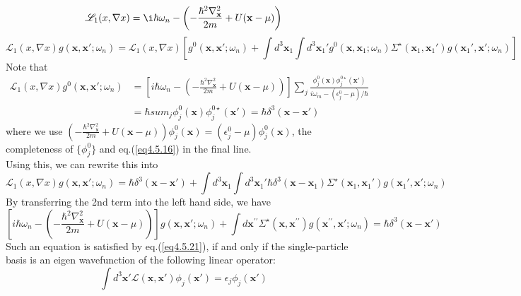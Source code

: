 \begin{equation}
\mathscr{L}_1(x,\nabla x)=\i\hbar \omega_n - \left( -\frac{\hbar^2\nabla^2_\mathbf{x}}{2m}+U(\mathbf{x}-\mu)\right)
\end{equation}
\[
\mathscr{L}_1(x,\nabla x) g(\mathbf{x},\mathbf{x}';\omega_n)=\mathscr{L}_1(x,\nabla x) \left[ g^0(\mathbf{x},\mathbf{x}';\omega_n)+\int d^3\mathbf{x}_1 \int d^3\mathbf{x}_1' g^0(\mathbf{x},\mathbf{x}_1;\omega_n)\Sigma^\star (\mathbf{x}_1,\mathbf{x}_1')g(\mathbf{x}_1',\mathbf{x}';\omega_n)\right]
\]
Note that
\begin{equation}\label{eq4.5.24}
\begin{aligned}
\mathscr{L}_1(x,\nabla x) g^0(\mathbf{x},\mathbf{x}';\omega_n)
&=\left[i\hbar \omega_n - \left( -\frac{\hbar^2\nabla^2_\mathbf{x}}{2m}+U(\mathbf{x}-\mu)\right) \right] \sum_j \frac{\phi_j^0(\mathbf{x})\phi_j^{0\star}(\mathbf{x'})}{i\omega_m-(\epsilon_j^0-\mu)/\hbar}\\
&=\hbar sum_j \phi_j^0(\mathbf{x})\phi_j^{0\star}(\mathbf{x'})=\hbar \delta^3 (\mathbf{x}-\mathbf{x}')
\end{aligned}
\end{equation}
where we use $\left( -\frac{\hbar^2\nabla^2_\mathbf{x}}{2m}+U(\mathbf{x}-\mu)\right)\phi_j^0 (\mathbf{x})=(\epsilon_j^0-\mu) \phi_j^0(\mathbf{x})$, the completeness of $\{ \phi_j^0\}$ and eq.(\ref{eq4.5.16}) in the final line.\\
Using this, we can rewrite this into
\begin{equation}
\mathscr{L}_1(x,\nabla x) g(\mathbf{x},\mathbf{x}';\omega_n)=\hbar \delta^3(\mathbf{x}-\mathbf{x}')+\int d^3\mathbf{x}_1\int d^3\mathbf{x}_1'\hbar \delta^3(\mathbf{x}-\mathbf{x}_1)\Sigma^\star (\mathbf{x}_1,\mathbf{x}_1')g(\mathbf{x}_1',\mathbf{x}';\omega_n)
\end{equation}
By transferring the 2nd term into the left hand side, we have
\begin{equation}\label{eq4.5.26}
\left[i\hbar \omega_n - \left( -\frac{\hbar^2\nabla^2_\mathbf{x}}{2m}+U(\mathbf{x}-\mu)\right) \right] g(\mathbf{x},\mathbf{x}';\omega_n)+\int d \mathbf{x}^{\prime \prime} \Sigma^\star (\mathbf{x},\mathbf{x}^{\prime\prime})g(\mathbf{x}^{\prime\prime},\mathbf{x}';\omega_n)=\hbar \delta^3(\mathbf{x}-\mathbf{x}')
\end{equation}
Such an equation is satisfied by eq.(\ref{eq4.5.21}), if and only if the single-particle basis is an eigen wavefunction of the following linear operator:
\begin{equation}\label{eq4.5.27}
\int d^3 \mathbf{x}' \mathscr{L}(\mathbf{x},\mathbf{x}')\phi_j(\mathbf{x}')=\epsilon_j\phi_j(\mathbf{x}')
\end{equation}
